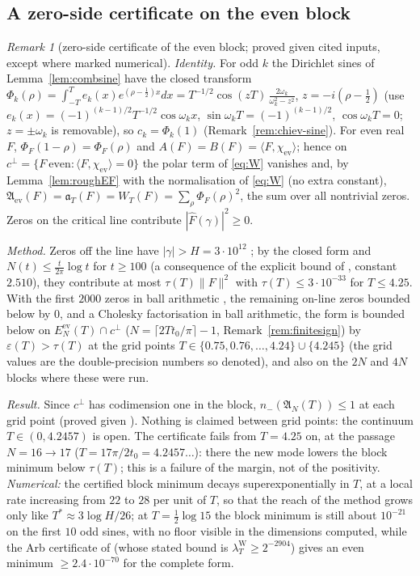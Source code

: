 \documentclass[11pt]{amsart}
\theoremstyle{definition}
\theoremstyle{remark}
\newtheorem{remark}[theorem]{Remark}
\newcommand{\lamW}{\lambda^{\mathrm W}_T}
\newcommand{\Fh}{\widehat F}
\begin{document}
\subsection{A zero-side certificate on the even block}\label{subsec:enclzcert}
\begin{remark}[zero-side certificate of the even block; proved given cited inputs, except where marked numerical]\label{rem:zcert}
\emph{Identity.} For odd $k$ the Dirichlet sines of Lemma~\ref{lem:combsine} have the closed transform
$\Phi_k(\rho)=\int_{-T}^{T}e_k(x)e^{(\rho-\frac12)x}dx=T^{-1/2}\cos(zT)\,\frac{2\omega_k}{\omega_k^2-z^2}$,
$z=-i(\rho-\tfrac12)$ (use $e_k(x)=(-1)^{(k-1)/2}T^{-1/2}\cos\omega_kx$, $\sin\omega_kT=(-1)^{(k-1)/2}$, $\cos\omega_kT=0$;
$z=\pm\omega_k$ is removable), so $c_k=\Phi_k(1)$ (Remark~\ref{rem:chiev-sine}). For even real $F$,
$\Phi_F(1-\rho)=\Phi_F(\rho)$ and $A(F)=B(F)=\langle F,\chi_{\mathrm{ev}}\rangle$; hence on
$c^\perp=\{F\ \mathrm{even}:\langle F,\chi_{\mathrm{ev}}\rangle=0\}$ the polar term of \eqref{eq:W} vanishes and, by
Lemma~\ref{lem:roughEF} with the normalisation of \eqref{eq:W} (no extra constant),
$\mathfrak A_{\mathrm{ev}}(F)=\mathfrak a_T(F)=W_T(F)=\sum_\rho\Phi_F(\rho)^2$, the sum over all nontrivial zeros.
Zeros on the critical line contribute $|\Fh(\gamma)|^2\ge0$.

\emph{Method.} Zeros off the line have $|\gamma|>H=3\cdot10^{12}$ \cite{PlattTrudgian2021}; by the closed form and
$N(t)\le\frac t{2\pi}\log t$ for $t\ge100$ (a consequence of the explicit bound of \cite{Trudgian2014}, constant $2.510$), they
contribute at most $\tau(T)\|F\|^2$ with $\tau(T)\le3\cdot10^{-33}$ for $T\le4.25$. With the first $2000$ zeros in ball
arithmetic \cite{Johansson2017}, the remaining on-line zeros bounded below by $0$, and a Cholesky factorisation in ball arithmetic,
the form is bounded below on $E_N^{\mathrm{ev}}(T)\cap c^\perp$ ($N=\lceil2Tt_0/\pi\rceil-1$, Remark~\ref{rem:finitesign}) by
$\varepsilon(T)>\tau(T)$ at the grid points $T\in\{0.75,0.76,\dots,4.24\}\cup\{4.245\}$ (the grid values are the
double-precision numbers so denoted), and also on the $2N$ and $4N$ blocks where these were run.

\emph{Result.} Since $c^\perp$ has codimension one in the block, $n_-(\mathfrak A_N(T))\le1$ at each grid point
(proved given \cite{PlattTrudgian2021,Trudgian2014,Johansson2017}). Nothing is claimed between grid points: the
continuum $T\in(0,4.2457)$ is open. The certificate fails from $T=4.25$ on, at the passage $N=16\to17$
($T=17\pi/2t_0=4.2457\ldots$): there the new mode lowers the block minimum below $\tau(T)$; this is a failure of the margin,
not of the positivity. \emph{Numerical:} the certified block minimum decays superexponentially in $T$, at a local rate
increasing from $22$ to $28$ per unit of $T$, so that the reach of the method grows only like $T^*\approx3\log H/26$;
at $T=\frac12\log15$ the block minimum is still about $10^{-21}$ on the first $10$ odd sines, with no floor visible in the
dimensions computed, while the Arb certificate of \cite{Mori15} (whose stated bound is $\lamW\ge2^{-2904}$) gives an even
minimum $\ge2.4\cdot10^{-70}$ for the complete form.


\end{remark}
\end{document}

